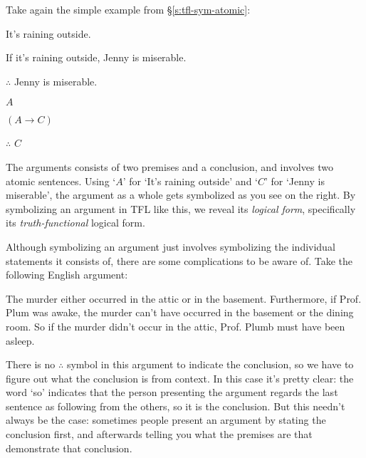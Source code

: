 Take again the simple example from \S\ref{s:tfl-sym-atomic}:
\begin{multicols}{2}
	\begin{earg}
		\item[\eref{exarg1}] It's raining outside.
		\item[] If it's raining outside, Jenny is miserable.
		\item[] $\therefore$ Jenny is miserable.
	\end{earg}
\columnbreak
	\begin{earg}
		\item[] $A$
		\item[] $(A \rightarrow C)$
		\item[] $\therefore$ $C$
	\end{earg}
\end{multicols}
\noindent The arguments consists of two premises and a conclusion, and involves two atomic sentences.  Using `$A$' for `It's raining outside' and `$C$' for `Jenny is miserable', the argument as a whole gets symbolized as you see on the right.  By symbolizing an argument in TFL like this, we reveal its \emph{logical form}, specifically its \emph{truth-functional} logical form.

Although symbolizing an argument just involves symbolizing the individual statements it consists of, there are some complications to be aware of.  Take the following English argument:
\begin{earg}
\item[] The murder either occurred in the attic or in the basement.  Furthermore, if Prof. Plum was awake, the murder can't have occurred in the basement or the dining room.  So if the murder didn't occur in the attic, Prof. Plumb must have been asleep.
\end{earg}
There is no $\therefore$ symbol in this argument to indicate the conclusion, so we have to figure out what the conclusion is from context.  In this case it's pretty clear: the word `so' indicates that the person presenting the argument regards the last sentence as following from the others, so it is the conclusion.  But this needn't always be the case: sometimes people present an argument by stating the conclusion first, and afterwards telling you what the premises are that demonstrate that conclusion.

